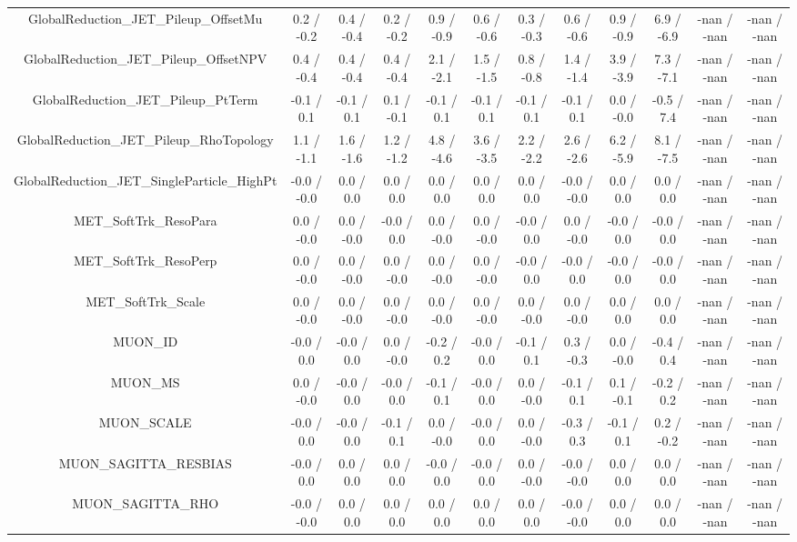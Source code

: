\begin{table}[htbp]
\begin{center}
\begin{tabular}{|c|c|c|c|c|c|c|c|c|c|c|c|}
  GlobalReduction_JET_Pileup_OffsetMu & 0.2 / -0.2 & 0.4 / -0.4 & 0.2 / -0.2 & 0.9 / -0.9 & 0.6 / -0.6 & 0.3 / -0.3 & 0.6 / -0.6 & 0.9 / -0.9 & 6.9 / -6.9 & -nan / -nan & -nan / -nan \\ 
  GlobalReduction_JET_Pileup_OffsetNPV & 0.4 / -0.4 & 0.4 / -0.4 & 0.4 / -0.4 & 2.1 / -2.1 & 1.5 / -1.5 & 0.8 / -0.8 & 1.4 / -1.4 & 3.9 / -3.9 & 7.3 / -7.1 & -nan / -nan & -nan / -nan \\ 
  GlobalReduction_JET_Pileup_PtTerm & -0.1 / 0.1 & -0.1 / 0.1 & 0.1 / -0.1 & -0.1 / 0.1 & -0.1 / 0.1 & -0.1 / 0.1 & -0.1 / 0.1 & 0.0 / -0.0 & -0.5 / 7.4 & -nan / -nan & -nan / -nan \\ 
  GlobalReduction_JET_Pileup_RhoTopology & 1.1 / -1.1 & 1.6 / -1.6 & 1.2 / -1.2 & 4.8 / -4.6 & 3.6 / -3.5 & 2.2 / -2.2 & 2.6 / -2.6 & 6.2 / -5.9 & 8.1 / -7.5 & -nan / -nan & -nan / -nan \\ 
  GlobalReduction_JET_SingleParticle_HighPt & -0.0 / -0.0 & 0.0 / 0.0 & 0.0 / 0.0 & 0.0 / 0.0 & 0.0 / 0.0 & 0.0 / 0.0 & -0.0 / -0.0 & 0.0 / 0.0 & 0.0 / 0.0 & -nan / -nan & -nan / -nan \\ 
  MET_SoftTrk_ResoPara & 0.0 / -0.0 & 0.0 / -0.0 & -0.0 / 0.0 & 0.0 / -0.0 & 0.0 / -0.0 & -0.0 / 0.0 & 0.0 / -0.0 & -0.0 / 0.0 & -0.0 / 0.0 & -nan / -nan & -nan / -nan \\ 
  MET_SoftTrk_ResoPerp & 0.0 / -0.0 & 0.0 / -0.0 & 0.0 / -0.0 & 0.0 / -0.0 & 0.0 / -0.0 & -0.0 / 0.0 & -0.0 / 0.0 & -0.0 / 0.0 & -0.0 / 0.0 & -nan / -nan & -nan / -nan \\ 
  MET_SoftTrk_Scale & 0.0 / -0.0 & 0.0 / -0.0 & 0.0 / -0.0 & 0.0 / -0.0 & 0.0 / -0.0 & 0.0 / -0.0 & 0.0 / -0.0 & 0.0 / 0.0 & 0.0 / 0.0 & -nan / -nan & -nan / -nan \\ 
  MUON_ID & -0.0 / 0.0 & -0.0 / 0.0 & 0.0 / -0.0 & -0.2 / 0.2 & -0.0 / 0.0 & -0.1 / 0.1 & 0.3 / -0.3 & 0.0 / -0.0 & -0.4 / 0.4 & -nan / -nan & -nan / -nan \\ 
  MUON_MS & 0.0 / -0.0 & -0.0 / 0.0 & -0.0 / 0.0 & -0.1 / 0.1 & -0.0 / 0.0 & 0.0 / -0.0 & -0.1 / 0.1 & 0.1 / -0.1 & -0.2 / 0.2 & -nan / -nan & -nan / -nan \\ 
  MUON_SCALE & -0.0 / 0.0 & -0.0 / 0.0 & -0.1 / 0.1 & 0.0 / -0.0 & -0.0 / 0.0 & 0.0 / -0.0 & -0.3 / 0.3 & -0.1 / 0.1 & 0.2 / -0.2 & -nan / -nan & -nan / -nan \\ 
  MUON_SAGITTA_RESBIAS & -0.0 / 0.0 & 0.0 / 0.0 & 0.0 / 0.0 & -0.0 / 0.0 & -0.0 / 0.0 & 0.0 / -0.0 & -0.0 / -0.0 & 0.0 / 0.0 & 0.0 / 0.0 & -nan / -nan & -nan / -nan \\ 
  MUON_SAGITTA_RHO & -0.0 / -0.0 & 0.0 / 0.0 & 0.0 / 0.0 & 0.0 / 0.0 & 0.0 / 0.0 & 0.0 / 0.0 & -0.0 / -0.0 & 0.0 / 0.0 & 0.0 / 0.0 & -nan / -nan & -nan / -nan \\ 

\end{tabular}
\end{center}
\end{table}
